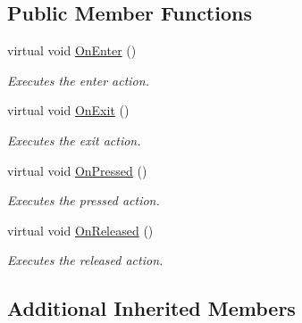 \subsection*{Public Member Functions}
\begin{DoxyCompactItemize}
\item 
virtual void \hyperlink{classae_button_script_a31b079712874fdb93a5dbb34de26c44c}{On\+Enter} ()\hypertarget{classae_button_script_a31b079712874fdb93a5dbb34de26c44c}{}\label{classae_button_script_a31b079712874fdb93a5dbb34de26c44c}

\begin{DoxyCompactList}\small\item\em Executes the enter action. \end{DoxyCompactList}\item 
virtual void \hyperlink{classae_button_script_a2a30b245d1a5b50618e0d5fe93340034}{On\+Exit} ()\hypertarget{classae_button_script_a2a30b245d1a5b50618e0d5fe93340034}{}\label{classae_button_script_a2a30b245d1a5b50618e0d5fe93340034}

\begin{DoxyCompactList}\small\item\em Executes the exit action. \end{DoxyCompactList}\item 
virtual void \hyperlink{classae_button_script_a637f94fac009f1db840c87e44c6549bc}{On\+Pressed} ()\hypertarget{classae_button_script_a637f94fac009f1db840c87e44c6549bc}{}\label{classae_button_script_a637f94fac009f1db840c87e44c6549bc}

\begin{DoxyCompactList}\small\item\em Executes the pressed action. \end{DoxyCompactList}\item 
virtual void \hyperlink{classae_button_script_ae8f1f681631336066515f9cc385b5383}{On\+Released} ()\hypertarget{classae_button_script_ae8f1f681631336066515f9cc385b5383}{}\label{classae_button_script_ae8f1f681631336066515f9cc385b5383}

\begin{DoxyCompactList}\small\item\em Executes the released action. \end{DoxyCompactList}\end{DoxyCompactItemize}
\subsection*{Additional Inherited Members}


